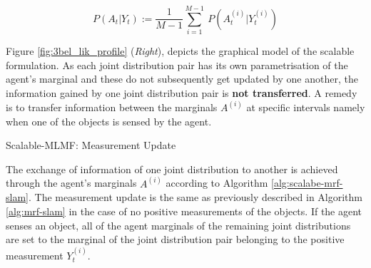 \begin{equation}
  P(A_t|Y_t) := \frac{1}{M-1} \sum\limits_{i=1}^{M-1} \ P(A^{(i)}_t|Y^{(i)}_t) \label{eq:marg_indep_sum}
\end{equation}

Figure \ref{fig:3bel_lik_profile} (\textit{Right}), depicts the graphical model of the scalable formulation. 
As each joint distribution pair has its own parametrisation of the agent's marginal and these do not subsequently get updated by one another,
the information gained by one joint distribution pair is \textbf{not transferred}.
A remedy is to transfer information between the marginals $A^{(i)}$ at specific intervals namely when one of the objects is sensed by the agent. 

\begin{center}
\begin{minipage}{\linewidth}

\begin{algorithm}[H]
\label{alg:scalabe-mrf-slam}
\BlankLine

\caption{Scalable-MLMF: Measurement Update}
\end{algorithm} 
\end{minipage}
\end{center}


The exchange of information of one joint distribution to another is achieved through the agent's marginals $A^{(i)}$ according to Algorithm \ref{alg:scalabe-mrf-slam}.
The measurement update is the same as previously described in Algorithm \ref{alg:mrf-slam} in the case of no positive measurements of the objects. If the agent
senses an object, all of the agent marginals of the remaining joint distributions are set to the marginal of the joint distribution pair belonging to the positive 
measurement $Y^{(i)}_t$. 

